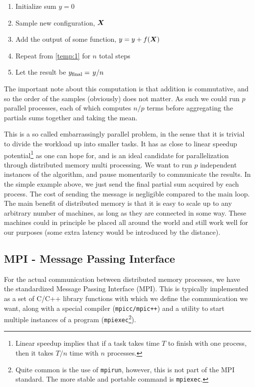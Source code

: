 \documentclass[Thesis.tex]{subfiles}
\begin{document}
\begin{enumerate}
\item Initialize sum $y = 0$
\item Sample new configuration, $\bm{X}$\label{temp:1}
\item Add the output of some function, $y = y + f(\bm{X})$
\item Repeat from \ref{temp:1} for $n$ total steps
\item Let the result be $y_\text{final} = \flatfrac{y}{n}$
\end{enumerate}
The important note about this computation is that addition is commutative, and
so the order of the samples (obviously) does not matter. As such we could run
$p$ parallel processes, each of which computes $n / p$ terms before aggregating
the partials sums together and taking the mean.

This is a so called embarrassingly parallel problem, in the sense that it is
trivial to divide the workload up into smaller tasks. It has as close to linear
speedup potential\footnote{Linear speedup implies that if a task takes time $T$
to finish with one process, then it takes $T/n$ time with $n$ processes.} as one
can hope for, and is an ideal candidate for parallelization through distributed
memory multi processing. We want to run $p$ independent instances of the
algorithm, and pause momentarily to communicate the results. In the simple
example above, we just send the final partial sum acquired by each process. The
cost of sending the message is negligible compared to the main loop.
The main benefit of distributed memory is that it is easy to scale up to any
arbitrary number of machines, as long as they are connected in some way. These
machines could in principle be placed all around the world and still work well
for our purposes (some extra latency would be introduced by the distance).

\subsection{MPI - Message Passing Interface}

For the actual communication between distributed memory processes, we have the
standardized Message Passing Interface (MPI). This is typically implemented as a
set of C/C++ library functions with which we define the communication we want,
along with a special compiler (\texttt{mpicc/mpic++}) and a utility to start
multiple instances of a program (\texttt{mpiexec}\footnote{Quite common is the
  use of \texttt{mpirun}, however, this is not part of the MPI standard. The
  more stable and portable command is \texttt{mpiexec}.}).
\end{document}
